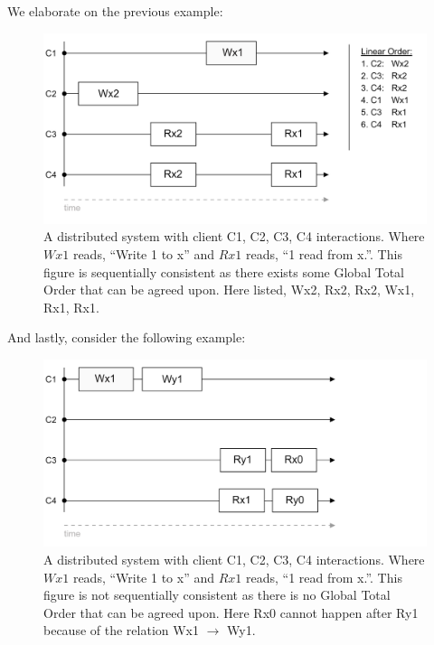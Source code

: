 \noindent
We elaborate on the previous example:
\begin{figure}[h]
    \centering
    \includegraphics[width=.9\textwidth]{Sections/consist/seq2.png}
    \caption{A distributed system with client C1, C2, C3, C4 interactions. Where $Wx1$ reads, ``Write 1 to x'' and $Rx1$ reads, ``1 read from x.''. This 
    figure is sequentially consistent as there exists some Global Total Order that can be agreed upon. Here listed, Wx2, Rx2, Rx2, Wx1, Rx1, Rx1.}
\end{figure}

\noindent
And lastly, consider the following example:\\

\vspace{-1em}
\begin{figure}[ht!]
    \centering
    \includegraphics[width=.9\textwidth]{Sections/consist/seq3.png}
    \caption{A distributed system with client C1, C2, C3, C4 interactions. Where $Wx1$ reads, ``Write 1 to x'' and $Rx1$ reads, ``1 read from x.''. This 
    figure is not sequentially consistent as there is no Global Total Order that can be agreed upon. Here Rx0 cannot happen after Ry1 because 
    of the relation Wx1 $\rightarrow$ Wy1.}
    \label{fig:seq3}
\end{figure}



\newpage 

